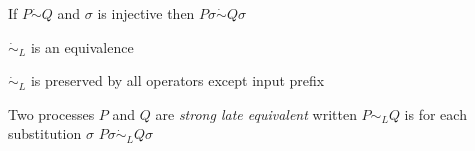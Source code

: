 \begin{proposition}
  If $P \dot{\sim} Q$ and $\sigma$ is injective then $P\sigma \dot{\sim} Q\sigma$
% 	
\end{proposition}

\begin{proposition}
  $\dot{\sim}_{L}$ is an equivalence
\end{proposition}

\begin{proposition}
  $\dot{\sim}_{L}$ is preserved by all operators except input prefix
\end{proposition}

\begin{definition}
  Two processes $P$ and $Q$ are \emph{strong late equivalent} written $P\sim_{L}Q$ is for each substitution $\sigma$ $P\sigma \dot{\sim}_{L}Q\sigma$
\end{definition}

